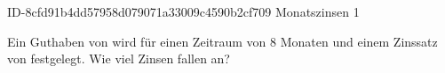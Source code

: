\begin{exercise}
      {ID-8cfd91b4dd57958d079071a33009c4590b2cf709}
      {Monatszinsen 1}
  \ifproblem\problem\par
    Ein Guthaben von  wird für einen Zeitraum von \num{8} Monaten
    und einem Zinssatz von  festgelegt. Wie viel Zinsen fallen an?
  \fi
\end{exercise}
